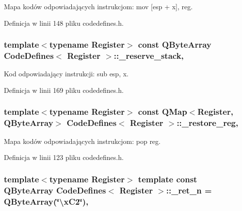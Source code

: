 Mapa kodów odpowiadających instrukcjom\-: mov \mbox{[}esp + x\mbox{]}, reg. 



Definicja w linii 148 pliku codedefines.\-h.

\hypertarget{class_code_defines_af7595fd95c2c9b4ea2f83cf2946f23e2}{
\subsubsection[{\-\_\-reserve\-\_\-stack}]{\setlength{\rightskip}{0pt plus 5cm}template$<$typename Register$>$ const Q\-Byte\-Array {\bf Code\-Defines}$<$ Register $>$\-::\-\_\-reserve\-\_\-stack\hspace{0.3cm}{\ttfamily [static]}, {\ttfamily [private]}}}\label{class_code_defines_af7595fd95c2c9b4ea2f83cf2946f23e2}


Kod odpowiadający instrukcji\-: sub esp, x. 



Definicja w linii 169 pliku codedefines.\-h.

\hypertarget{class_code_defines_a51318323f5ac7e9fa178aaa82db83c29}{
\subsubsection[{\-\_\-restore\-\_\-reg}]{\setlength{\rightskip}{0pt plus 5cm}template$<$typename Register$>$ const Q\-Map$<$Register, Q\-Byte\-Array$>$ {\bf Code\-Defines}$<$ Register $>$\-::\-\_\-restore\-\_\-reg\hspace{0.3cm}{\ttfamily [static]}, {\ttfamily [private]}}}\label{class_code_defines_a51318323f5ac7e9fa178aaa82db83c29}


Mapa kodów odpowiadających instrukcjom\-: pop reg. 



Definicja w linii 123 pliku codedefines.\-h.

\hypertarget{class_code_defines_aa3be27e8f78dec6d99094b54a3363ba4}{
\subsubsection[{\-\_\-ret\-\_\-n}]{\setlength{\rightskip}{0pt plus 5cm}template$<$typename Register$>$ template const Q\-Byte\-Array {\bf Code\-Defines}$<$ Register $>$\-::\-\_\-ret\-\_\-n = Q\-Byte\-Array(\char`\"{}\textbackslash{}x\-C2\char`\"{})\hspace{0.3cm}{\ttfamily [static]}, {\ttfamily [private]}}}\label{class_code_defines_aa3be27e8f78dec6d99094b54a3363ba4}


